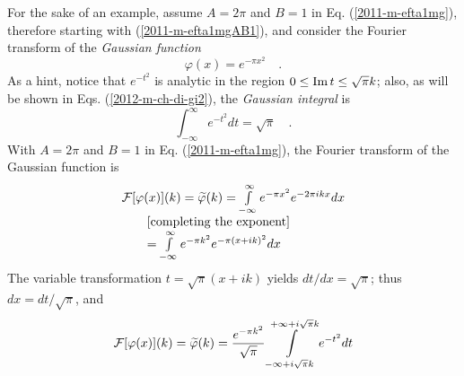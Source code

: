 {
\color{blue}
\bexample


For the sake of an example,
assume $A=2\pi $ and $B=1$  in Eq. (\ref{2011-m-efta1mg}), therefore starting with (\ref{2011-m-efta1mgAB1}),
and consider the  Fourier transform of the  {\em Gaussian function}
\begin{equation}
\varphi (x)= e^{-\pi x^2}  \quad .
\label{2012-m-ch-fa-gaussian}
\end{equation}
As a hint, notice that $e^{-t^2}$ is analytic in the region $0\leq{\rm Im}\,t\leq \sqrt{\pi }k$;
also, as will be shown in Eqs. (\ref{2012-m-ch-di-gi2}), the {\em Gaussian integral}
 is
\begin{equation}
\int_{-\infty}^\infty
 e^{-t^2} dt =\sqrt{\pi }\quad .
\end{equation}
With $A=2\pi $ and $B=1$  in Eq. (\ref{2011-m-efta1mg}), the Fourier transform of the  Gaussian function is
\begin{equation}
\begin{array}{l}
    {\cal F}[\varphi (x)](k)=\widetilde{ \varphi} (k) =  \int\limits_{-\infty}^\infty
                 e^{-\pi  x^2}  e^{- 2\pi ikx} dx
\\ \qquad
[\textrm{completing the exponent}]
\\  \qquad
              =  \int\limits_{-\infty}^\infty
                 e^{-{\pi  k^2}}e^{-\pi \left(x+{i}k\right)^2}   dx
\end{array}
\end{equation}
The variable transformation  $t=\sqrt{\pi} (x + {i}k) $
yields
$dt/ dx=\sqrt{\pi} $; thus $dx = dt/ \sqrt{\pi}$, and
\begin{equation}
   {\cal F}[\varphi (x)](k)=\widetilde{ \varphi} (k)=\frac{ e^{-{\pi k^2}}}{\sqrt{\pi} }
                 \int\limits_{-\infty+i\sqrt{\pi} {k}}^{+\infty+i\sqrt{\pi} {k}}
                 e^{-t^2}  dt
\label{2012-m-ch-dergauin1}
\end{equation}

}
